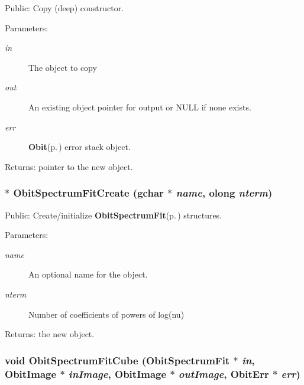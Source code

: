 Public: Copy (deep) constructor. 

\begin{Desc}
\item[Parameters:]
\begin{description}
\item[{\em in}]The object to copy \item[{\em out}]An existing object pointer for output or NULL if none exists. \item[{\em err}]{\bf Obit}{\rm (p.\,\pageref{structObit})} error stack object. \end{description}
\end{Desc}
\begin{Desc}
\item[Returns:]pointer to the new object. \end{Desc}
\subsubsection{$\ast$ Obit\-Spectrum\-Fit\-Create (gchar $\ast$ {\em name}, {\bf olong} {\em nterm})}\label{ObitSpectrumFit_8c_a15}


Public: Create/initialize {\bf Obit\-Spectrum\-Fit}{\rm (p.\,\pageref{structObitSpectrumFit})} structures. 

\begin{Desc}
\item[Parameters:]
\begin{description}
\item[{\em name}]An optional name for the object. \item[{\em nterm}]Number of coefficients of powers of log(nu) \end{description}
\end{Desc}
\begin{Desc}
\item[Returns:]the new object. \end{Desc}
\subsubsection{\setlength{\rightskip}{0pt plus 5cm}void Obit\-Spectrum\-Fit\-Cube ({\bf Obit\-Spectrum\-Fit} $\ast$ {\em in}, {\bf Obit\-Image} $\ast$ {\em in\-Image}, {\bf Obit\-Image} $\ast$ {\em out\-Image}, {\bf Obit\-Err} $\ast$ {\em err})}\label{ObitSpectrumFit_8c_a16}


